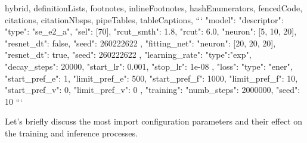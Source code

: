 \shorthandoff{-}
\begin{markdown*}{%
  hybrid,
  definitionLists,
  footnotes,
  inlineFootnotes,
  hashEnumerators,
  fencedCode,
  citations,
  citationNbsps,
  pipeTables,
  tableCaptions,
}
```
{
  "model": {
    "descriptor": {
      "type": "se_e2_a",
      "sel": [70],
      "rcut_smth": 1.8,
      "rcut": 6.0,
      "neuron": [5, 10, 20],
      "resnet_dt": false,
      "seed": 260222622
    },
    "fitting_net": {
      "neuron": [20, 20, 20],
      "resnet_dt": true,
      "seed": 260222622
    }
  },
  "learning_rate": {
    "type":"exp",
    "decay_steps": 20000,
    "start_lr": 0.001,
    "stop_lr": 1e-08
  },
  "loss": {
    "type": "ener",
    "start_pref_e": 1,
    "limit_pref_e": 500,
    "start_pref_f": 1000,
    "limit_pref_f": 10,
    "start_pref_v": 0,
    "limit_pref_v": 0
  },
  "training": {
    "numb_steps": 2000000,
    "seed": 10
  }
}
```
\end{markdown*}
\shorthandon{-}
\noindent Let's briefly discuss the most import configuration parameters and
their effect on the training and inference processes.

